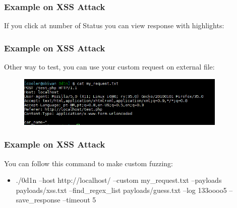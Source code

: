 \documentclass[serif,mathserif]{beamer}
\begin{document}
\begin{frame}
  \frametitle{Example on XSS Attack}
  If you click at number of Status you can view response with highlights:
  \begin{itemize}
  \begin{figure}[t]    
    \centering
  \end{figure}
 \end{itemize}
\end{frame}



\begin{frame}
  \frametitle{Example on XSS Attack}
  Other way to test, you can use your custom request on external file:
  \begin{itemize}
  \begin{figure}[]    
    \centering
    \includegraphics[width=10cm]{images/custom.png} 
  \end{figure}
 \end{itemize}
\end{frame}



\begin{frame}
  \frametitle{Example on XSS Attack}
  You can follow this command to make custom fuzzing:
  \begin{itemize}
   \item  ./0d1n --host http://localhost/ --custom my\_request.txt --payloads payloads/xss.txt --find\_regex\_list payloads/guess.txt  --log 133oooo5 --save\_response --timeout 5
  \end{itemize}
\end{frame}
\end{document}
